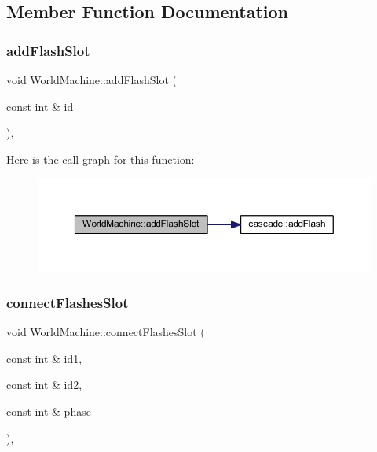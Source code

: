 \subsection{Member Function Documentation}
\mbox{\label{class_world_machine_a0985510eda06d6ed11cab70c2cc234f1}} 
\subsubsection{\texorpdfstring{add\+Flash\+Slot}{addFlashSlot}}
{\footnotesize\ttfamily void World\+Machine\+::add\+Flash\+Slot (\begin{DoxyParamCaption}\item[{const int \&}]{id }\end{DoxyParamCaption})\hspace{0.3cm}{\ttfamily [inline]}, {\ttfamily [slot]}}

Here is the call graph for this function\+:\nopagebreak
\begin{figure}[H]
\begin{center}
\leavevmode
\includegraphics[width=350pt]{class_world_machine_a0985510eda06d6ed11cab70c2cc234f1_cgraph}
\end{center}
\end{figure}
\mbox{\label{class_world_machine_adb2d5067594fa2f04f4c1035025ebe86}} 
\subsubsection{\texorpdfstring{connect\+Flashes\+Slot}{connectFlashesSlot}}
{\footnotesize\ttfamily void World\+Machine\+::connect\+Flashes\+Slot (\begin{DoxyParamCaption}\item[{const int \&}]{id1,  }\item[{const int \&}]{id2,  }\item[{const int \&}]{phase }\end{DoxyParamCaption})\hspace{0.3cm}{\ttfamily [inline]}, {\ttfamily [slot]}}

